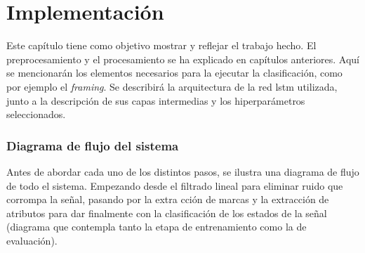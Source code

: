 \chapter{Implementación} \label{ch:results}

\indent Este capítulo tiene como objetivo mostrar y reflejar el trabajo hecho. El preprocesamiento y el
procesamiento se ha explicado en capítulos anteriores. Aquí se mencionarán los elementos necesarios para la ejecutar
la clasificación, como por ejemplo el \textit{framing}. Se describirá la arquitectura de la red \gls{lstm}
utilizada, junto a la descripción de sus capas intermedias y los hiperparámetros seleccionados. \bigskip

\subsection*{Diagrama de flujo del sistema} \label{subsec:flow-diagram}

\indent Antes de abordar cada uno de los distintos pasos, se ilustra una diagrama de flujo de todo el sistema.
Empezando desde el filtrado lineal para eliminar ruido que corrompa la señal, pasando por la extra cción de marcas y
la extracción de atributos para dar finalmente con la clasificación de los estados de la señal (diagrama que
contempla tanto la etapa de entrenamiento como la de evaluación).


